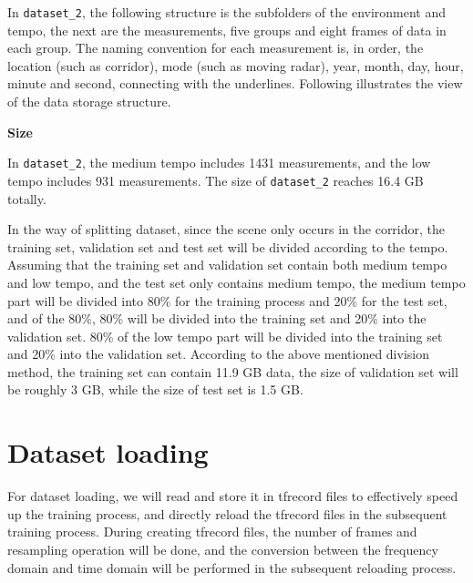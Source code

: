 In \texttt{dataset\_2}, the following structure is the subfolders of the environment and tempo, the next are the measurements, five groups and eight frames of data in each group. The naming convention for each measurement is, in order, the location (such as corridor), mode (such as moving radar), year, month, day, hour, minute and second, connecting with the underlines. Following illustrates the view of the data storage structure.

\begin{spacing}{1.5}
\textbf{\large{Size}}
\end{spacing}

In \texttt{dataset\_2}, the medium tempo includes 1431 measurements, and the low tempo includes 931 measurements. The size of \texttt{dataset\_2} reaches 16.4 GB totally.

In the way of splitting dataset, since the scene only occurs in the corridor, the training set, validation set and test set will be divided according to the tempo. Assuming that the training set and validation set contain both medium tempo and low tempo, and the test set only contains medium tempo, the medium tempo part will be divided into 80\% for the training process and 20\% for the test set, and of the 80\%, 80\% will be divided into the training set and 20\% into the validation set. 80\% of the low tempo part will be divided into the training set and 20\% into the validation set. According to the above mentioned division method, the training set can contain 11.9 GB data, the size of validation set will be roughly 3 GB, while the size of test set is 1.5 GB.

\section{Dataset loading} \label{dataset loading}

For dataset loading, we will read and store it in \gls{tfrecord} files to effectively speed up the training process, and directly reload the \gls{tfrecord} files in the subsequent training process. During creating \gls{tfrecord} files, the number of frames and resampling operation will be done, and the conversion between the frequency domain and time domain will be performed in the subsequent reloading process.


